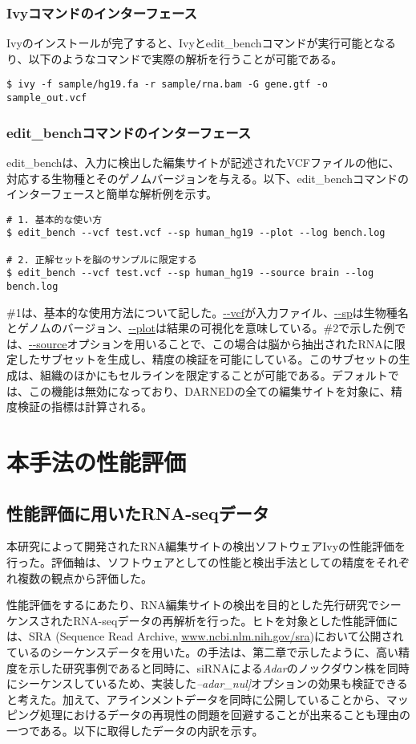 \subsubsection{Ivyコマンドのインターフェース}
Ivyのインストールが完了すると、Ivyとedit\_benchコマンドが実行可能となるり、以下のようなコマンドで実際の解析を行うことが可能である。

{\small
\begin{verbatim}
$ ivy -f sample/hg19.fa -r sample/rna.bam -G gene.gtf -o sample_out.vcf
\end{verbatim}
}

\subsubsection{edit\_benchコマンドのインターフェース}
edit\_benchは、入力に検出した編集サイトが記述されたVCFファイルの他に、対応する生物種とそのゲノムバージョンを与える。以下、edit\_benchコマンドのインターフェースと簡単な解析例を示す。
{\small
\begin{verbatim}
# 1. 基本的な使い方
$ edit_bench --vcf test.vcf --sp human_hg19 --plot --log bench.log

# 2. 正解セットを脳のサンプルに限定する
$ edit_bench --vcf test.vcf --sp human_hg19 --source brain --log bench.log
\end{verbatim}
\label{fig:edit_usage}
}

\#1は、基本的な使用方法について記した。\url{--vcf}が入力ファイル、\url{--sp}は生物種名とゲノムのバージョン、\url{--plot}は結果の可視化を意味している。\#2で示した例では、\url{--source}オプションを用いることで、この場合は脳から抽出されたRNAに限定したサブセットを生成し、精度の検証を可能にしている。このサブセットの生成は、組織のほかにもセルラインを限定することが可能である。デフォルトでは、この機能は無効になっており、DARNEDの全ての編集サイトを対象に、精度検証の指標は計算される。

\newpage

\section{本手法の性能評価}
\subsection{性能評価に用いたRNA-seqデータ}
本研究によって開発されたRNA編集サイトの検出ソフトウェアIvyの性能評価を行った。評価軸は、ソフトウェアとしての性能と検出手法としての精度をそれぞれ複数の観点から評価した。
\par
性能評価をするにあたり、RNA編集サイトの検出を目的とした先行研究でシーケンスされたRNA-seqデータの再解析を行った。ヒトを対象とした性能評価には、SRA (Sequence Read Archive, \url{www.ncbi.nlm.nih.gov/sra})において公開されている\cite{BahLeeLi1201}のシーケンスデータを用いた。\cite{BahLeeLi1201}の手法は、第二章で示したように、高い精度を示した研究事例であると同時に、siRNAによる\textit{Adar}のノックダウン株を同時にシーケンスしているため、実装した\textit{--adar\_nul]}オプションの効果も検証できると考えた。加えて、アラインメントデータを同時に公開していることから、マッピング処理におけるデータの再現性の問題を回避することが出来ることも理由の一つである。以下に取得したデータの内訳を示す。

